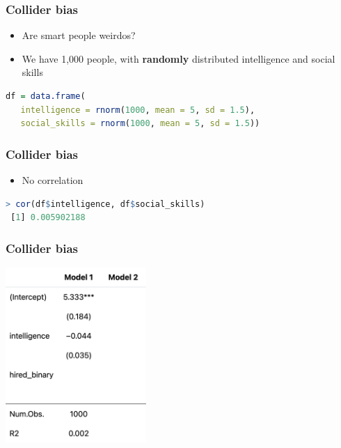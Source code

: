 \documentclass[aspectratio=43]{beamer}
\begin{document}
\begin{frame}[fragile]
\frametitle{Collider bias}
\centering

\begin{itemize}
  \item Are smart people weirdos?
  \item We have 1,000 people, with \textbf{randomly} distributed intelligence and social skills
\end{itemize}

 \begin{lstlisting}[language=R]
 df = data.frame(
   intelligence = rnorm(1000, mean = 5, sd = 1.5),
   social_skills = rnorm(1000, mean = 5, sd = 1.5))
 \end{lstlisting}

\end{frame}

\begin{frame}[fragile]
\frametitle{Collider bias}
\centering

\begin{itemize}
  \item No correlation
\end{itemize}

 \begin{lstlisting}[language=R]
 > cor(df$intelligence, df$social_skills)
 [1] 0.005902188
 \end{lstlisting}

\end{frame}

\begin{frame}
\frametitle{Collider bias}
\centering

\includegraphics[width = 0.4\textwidth]{../img/collider_m1}

\end{frame}
\end{document}
